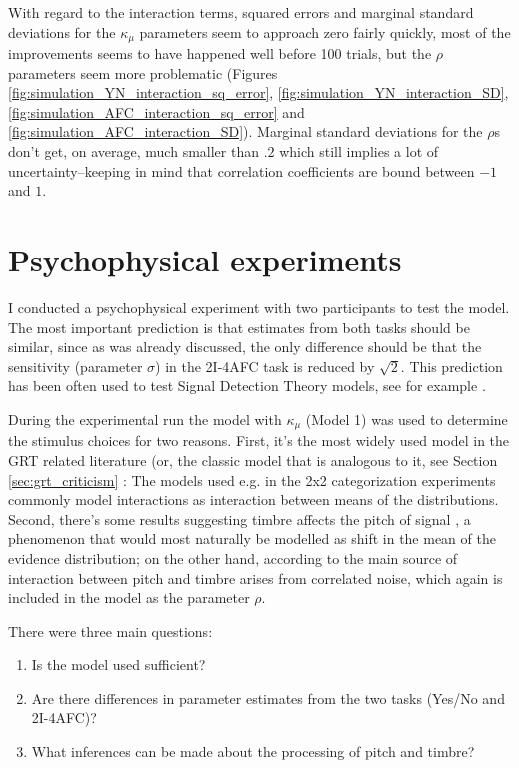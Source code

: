 \documentclass{article}\usepackage{knitr}
\begin{document}
With regard to the interaction terms, squared errors and marginal standard deviations for the $\kappa_{\mu}$ parameters seem to approach zero fairly quickly, most of the improvements seems to have happened well before 100 trials, but the $\rho$ parameters seem more problematic (Figures \ref{fig:simulation_YN_interaction_sq_error}, \ref{fig:simulation_YN_interaction_SD}, \ref{fig:simulation_AFC_interaction_sq_error} and \ref{fig:simulation_AFC_interaction_SD}). Marginal standard deviations for the $\rho$s don't get, on average, much smaller than $.2$ which still implies a lot of uncertainty--keeping in mind that correlation coefficients are bound between $-1$ and $1$.

\newpage


\section{Psychophysical experiments}
\label{sec:pp_exp}

I conducted a psychophysical experiment with two participants to test the model. The most important prediction is that estimates from both tasks should be similar, since as was already discussed, the only difference should be that the sensitivity (parameter $\sigma$) in the 2I-4AFC task is reduced by $\sqrt{2}$. This prediction has been often used to test Signal Detection Theory models, see for example \citet{wickens2002}. 

During the experimental run the model with $\kappa_{\mu}$ (Model 1) was used to determine the stimulus choices for two reasons. First, it's the most widely used model in the GRT related literature (or, the classic model that is analogous to it, see Section \ref{sec:grt_criticism} \textit{}: The models used e.g. in the 2x2 categorization experiments commonly model interactions as interaction between means of the distributions. Second, there's some results suggesting timbre affects the pitch of signal \citep{allen2014, platt1985}, a phenomenon that would most naturally be modelled as shift in the mean of the evidence distribution; on the other hand, according to  \cite{silbert2009} the main source of interaction between pitch and timbre arises from correlated noise, which again is included in the model as the parameter $\rho$. 

There were three main questions: 

\begin{enumerate}
  \item Is the model used sufficient? 
  \item Are there differences in parameter estimates from the two tasks (Yes/No and 2I-4AFC)?
  \item What inferences can be made about the processing of pitch and timbre?
\end{enumerate}
 
\end{document}
